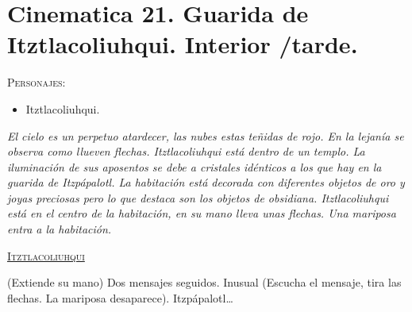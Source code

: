 \section{Cinematica 21. Guarida de Itztlacoliuhqui. Interior /tarde.}  \label{Cin:Cinematica21}
\textsc{Personajes}:
\begin{itemize}
\item Itztlacoliuhqui. 
\end{itemize}
\textit{El cielo es un perpetuo atardecer, las nubes estas teñidas de rojo. En la lejanía se observa como llueven flechas. Itztlacoliuhqui está dentro de un templo. La iluminación de sus aposentos se debe a cristales idénticos a los que hay en la guarida de Itzpápalotl. La habitación está decorada con diferentes objetos de oro y joyas preciosas pero lo que destaca son los objetos de obsidiana. Itztlacoliuhqui está en el centro de la habitación, en su mano lleva unas flechas. Una mariposa entra a la habitación.}
\begin{center}
\textsc{\underline{Itztlacoliuhqui}}
\\
\par
(Extiende su mano) Dos mensajes seguidos. Inusual (Escucha el mensaje, tira las flechas. La mariposa desaparece).  Itzpápalotl…
\end{center}